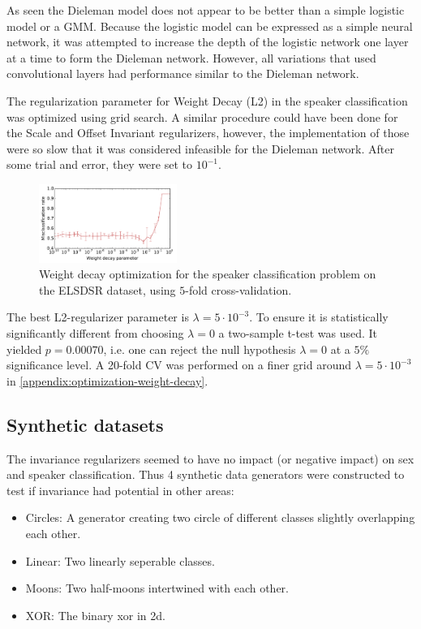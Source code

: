 As seen the Dieleman model does not appear to be better than a simple logistic model or a GMM. Because the logistic model can be expressed as a simple neural network, it was attempted to increase the depth of the logistic network one layer at a time to form the Dieleman network. However, all variations that used convolutional layers had performance similar to the Dieleman network.

The regularization parameter for Weight Decay (L2) in the speaker classification was optimized using grid search. A similar procedure could have been done for the Scale and Offset Invariant regularizers, however, the implementation of those were so slow that it was considered infeasible for the Dieleman network. After some trial and error, they were set to $10^{-1}$.

\begin{figure}[H]
  \centering
  \includegraphics[width=0.4\textwidth]{plots/reg_opt_dieleman_speaker_elsdsr}
  \caption{Weight decay optimization for the speaker classification problem on the ELSDSR dataset, using $5$-fold cross-validation.}
  \label{fig:reg_opt}
\end{figure}

The best L2-regularizer parameter is $\lambda = 5 \cdot 10^{-3}$. To ensure it is statistically significantly different from choosing $\lambda = 0$ a two-sample t-test was used. It yielded $p = 0.00070$, i.e. one can reject the null hypothesis $\lambda=0$ at a $5\%$ significance level. A 20-fold CV was performed on a finer grid around $\lambda = 5 \cdot 10^{-3}$ in \cref{appendix:optimization-weight-decay}.

\subsection{Synthetic datasets}

The invariance regularizers seemed to have no impact (or negative impact) on sex and speaker classification. Thus 4 synthetic data generators were constructed to test if invariance had potential in other areas:
\begin{itemize}
\item{Circles: A generator creating two circle of different classes slightly overlapping each other.}
\item{Linear: Two linearly seperable classes.}
\item{Moons: Two half-moons intertwined with each other.}
\item{XOR: The binary xor in 2d.}
\end{itemize}

